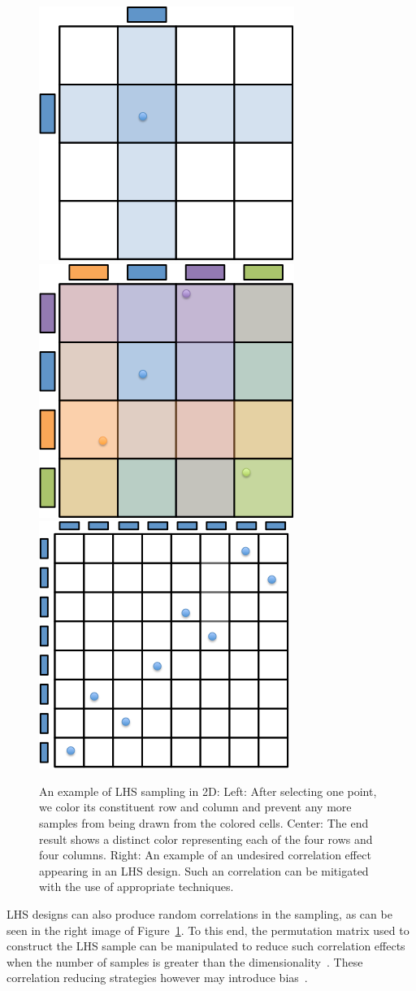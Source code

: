 \begin{figure}[t]
  \centering
  \includegraphics[width=.27\textwidth]{figs/chap3/lhs}\qquad
  \includegraphics[width=.27\textwidth]{figs/chap3/lhs2}\qquad
  \includegraphics[width=.27\textwidth]{figs/chap3/lhs3}
  \caption[2D Latin Hypercube Sampling Example]{An example of LHS sampling in
  2D: Left: After selecting one point, we color its constituent row and column
  and prevent any more samples from being drawn from the colored cells.
  Center: The end result shows a distinct color representing each of the four
  rows and four columns. Right: An example of an undesired correlation effect appearing in an LHS design. Such an correlation can be mitigated with the use of appropriate techniques.}
  \label{fig:lhsExample}
\end{figure}

LHS designs can also produce random correlations in the sampling, as can be seen in the right image of Figure~\ref{fig:lhsExample}.
%
To this end, the permutation matrix used to construct the LHS sample can be manipulated to reduce such correlation effects when the number of samples is greater than the dimensionality~\cite{ImanConover1982,Owen1994}.
%
These correlation reducing strategies however may introduce bias~\cite{OlssonSandbergDahlblom2003}.

